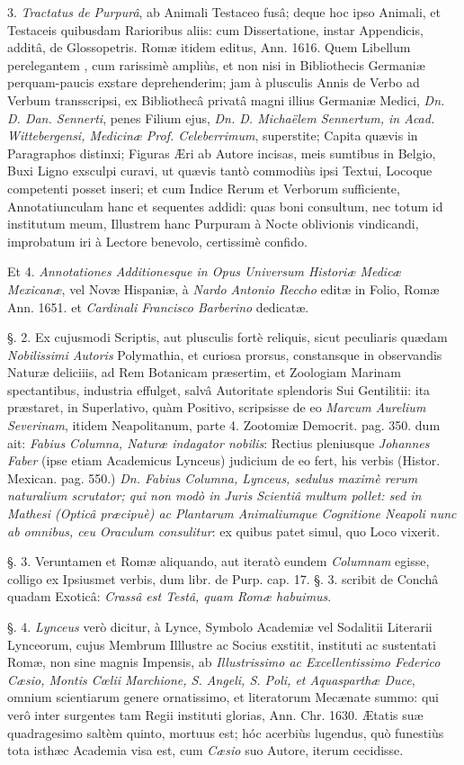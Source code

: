 \documentclass[a4paper, 11pt, oneside, polutonikogreek, german]{article}
\begin{document}
3. \emph{Tractatus de Purpurâ}, ab Animali Testaceo fusâ; deque hoc ipso Animali, et Testaceis quibusdam Rarioribus aliis: cum Dissertatione, instar Appendicis, additâ, de Glossopetris.  Romæ itidem editus, Ann. 1616. Quem Libellum perelegantem , cum rarissimè ampliùs, et non nisi in Bibliothecis Germaniæ perquam-paucis exstare deprehenderim; jam à plusculis Annis de Verbo ad Verbum transscripsi, ex Bibliothecâ privatâ magni illius Germaniæ Medici, \emph{Dn. D. Dan. Sennerti}, penes Filium ejus, \emph{Dn. D. Michaëlem Sennertum, in Acad. Wittebergensi, Medicinæ Prof. Celeberrimum}, superstite; Capita quævis in Paragraphos distinxi; Figuras Æri ab Autore incisas, meis sumtibus in Belgio, Buxi Ligno exsculpi curavi, ut quævis tantò commodiùs ipsi Textui, Locoque competenti posset inseri; et cum Indice Rerum et Verborum sufficiente, Annotatiunculam hanc et sequentes addidi: quas boni consultum, nec totum id institutum meum, Illustrem hanc Purpuram à Nocte oblivionis vindicandi, improbatum iri à Lectore benevolo, certissimè confido.

Et 4. \emph{Annotationes Additionesque in Opus Universum Historiæ Medicæ Mexicanæ}, vel Novæ Hispaniæ, à \emph{Nardo Antonio Reccho} editæ in Folio, Romæ Ann. 1651. et \emph{Cardinali Francisco Barberino} dedicatæ.

§. 2. Ex cujusmodi Scriptis, aut plusculis fortè reliquis, sicut peculiaris quædam \emph{Nobilissimi Autoris} Polymathia, et curiosa prorsus, constansque in observandis Naturæ deliciiis, ad Rem Botanicam præsertim, et Zoologiam Marinam spectantibus, industria effulget, salvâ Autoritate splendoris Sui Gentilitii: ita præstaret, in Superlativo, quàm Positivo, scripsisse de eo \emph{Marcum Aurelium Severinam}, itidem Neapolitanum, parte 4. Zootomiæ Democrit. pag. 350. dum ait: \emph{Fabius Columna, Naturæ indagator nobilis}: Rectius pleniusque \emph{Johannes Faber} (ipse etiam Academicus Lynceus) judicium de eo fert, his verbis (Histor. Mexican. pag. 550.) \emph{Dn. Fabius Columna, Lynceus, sedulus maximè rerum naturalium scrutator; qui non modò in Juris Scientiâ multum pollet: sed in Mathesi (Opticâ præcipuè) ac Plantarum Animaliumque Cognitione Neapoli nunc ab omnibus, ceu Oraculum consulitur}: ex quibus patet simul, quo Loco vixerit.

§. 3. Veruntamen et Romæ aliquando, aut iteratò eundem \emph{Columnam} egisse, colligo ex Ipsiusmet verbis, dum libr. de Purp. cap. 17. §. 3. scribit de Conchâ quadam Exoticâ: \emph{Crassâ est Testâ, quam Romæ habuimus}.

§. 4. \emph{Lynceus} verò dicitur, à Lynce, Symbolo Academiæ vel Sodalitii Literarii Lynceorum, cujus Membrum Illlustre ac Socius exstitit, instituti ac sustentati Romæ, non sine magnis Impensis, ab \emph{Illustrissimo ac Excellentissimo Federico Cæsio, Montis Cœlii Marchione, S. Angeli, S. Poli, et Aquasparthæ Duce}, omnium scientiarum genere ornatissimo, et literatorum Mecænate summo: qui verô inter surgentes tam Regii instituti glorias, Ann. Chr. 1630. Ætatis suæ quadragesimo saltèm quinto, mortuus est; hóc acerbiùs lugendus, quò funestiùs tota isthæc Academia visa est, cum \emph{Cæsio} suo Autore, iterum cecidisse.
\end{document}

